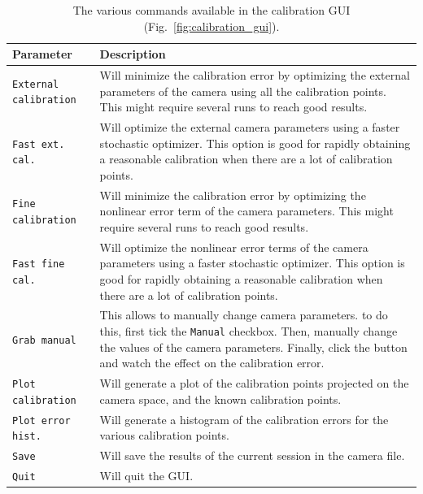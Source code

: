 \documentclass[10pt,a4paper]{article}
\begin{document}
\begin{table}[!ht]
	\centering
	\caption{The various commands available in the calibration GUI (Fig.~\ref{fig:calibration_gui}). \label{tab:calibration_gui}}
	\begin{tabular}{l m{10cm}}
		\hline
		Parameter & Description\\
		\hline
		
		\texttt{External calibration} & Will minimize the calibration error by optimizing the external parameters of the camera using all the calibration points. This might require several runs to reach good results.\\[.3em]
		
		\texttt{Fast ext. cal.} & Will optimize the external camera parameters using a faster stochastic optimizer. This option is good for rapidly obtaining a reasonable calibration when there are a lot of calibration points.\\[.3em]
		
		\texttt{Fine calibration} & Will minimize the calibration error by optimizing the nonlinear error term of the camera parameters. This might require several runs to reach good results. \\[.3em]
		
		\texttt{Fast fine cal.} & Will optimize the nonlinear error terms of the camera parameters using a faster stochastic optimizer. This option is good for rapidly obtaining a reasonable calibration when there are a lot of calibration points.\\[.3em]
		
		\texttt{Grab manual} & This allows to manually change camera parameters. to do this, first tick the \texttt{Manual} checkbox. Then, manually change the values of the camera parameters. Finally, click the button and watch the effect on the calibration error. \\[.3em]
		
		\texttt{Plot calibration} & Will generate a plot of the calibration points projected on the camera space, and the known calibration points.\\[.3em]
		
		\texttt{Plot error hist.} & Will generate a histogram of the calibration errors for the various calibration points. \\[.3em]
		
		\texttt{Save} & Will save the results of the current session in the camera file. \\[.3em]
		
		\texttt{Quit} & Will quit the GUI.\\[.3em]
		\hline
	\end{tabular}
\end{table}
\end{document}
